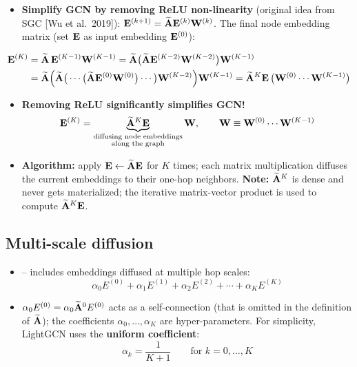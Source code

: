 \begin{itemize}
  \item \textbf{Simplify GCN by removing ReLU non-linearity} (original idea
    from SGC [Wu et al.\ 2019]): $\mathbf{E}^{(k+1)}=\widetilde{\mathbf{A}}\mathbf{E}^{(k)}\mathbf{W}^{(k)}$. The final
    node embedding matrix (set $\mathbf{E}$ as input embedding $\mathbf{E}^{(0)}$):
\end{itemize}
\begin{align}
  \mathbf{E}^{(K)} &= \widetilde{\mathbf{A}}\,\mathbf{E}^{(K-1)}\mathbf{W}^{(K-1)}
   = \widetilde{\mathbf{A}}\big(\widetilde{\mathbf{A}}\mathbf{E}^{(K-2)}\mathbf{W}^{(K-2)}\big)\mathbf{W}^{(K-1)}\notag\\
  &= \widetilde{\mathbf{A}}\Big(\widetilde{\mathbf{A}}\big(\cdots\big(\widetilde{\mathbf{A}}\mathbf{E}^{(0)}\mathbf{W}^{(0)}\big)\cdots\big)
     \mathbf{W}^{(K-2)}\Big)\mathbf{W}^{(K-1)}
   = \widetilde{\mathbf{A}}^K\mathbf{E}\,\big(\mathbf{W}^{(0)}\cdots\mathbf{W}^{(K-1)}\big)
  \label{eq:lec11-unroll}
\end{align}
\begin{itemize}
  \item \textbf{Removing ReLU significantly simplifies GCN!}
    \begin{equation}\label{eq:lec11-diffuse}
      \mathbf{E}^{(K)}=\underbrace{\widetilde{\mathbf{A}}^K\mathbf{E}}_{\substack{\text{diffusing node
      embeddings}\\\text{along the graph}}}\mathbf{W},\qquad
      \mathbf{W}\equiv\mathbf{W}^{(0)}\cdots\mathbf{W}^{(K-1)}
    \end{equation}
  \item \textbf{Algorithm:} apply $\mathbf{E}\leftarrow\widetilde{\mathbf{A}}\mathbf{E}$ for $K$ times; each
    matrix multiplication diffuses the current embeddings to their one-hop
    neighbors. \textbf{Note:} $\widetilde{\mathbf{A}}^K$ is dense and never gets materialized;
    the iterative matrix-vector product is used to compute $\widetilde{\mathbf{A}}^K\mathbf{E}$.
\end{itemize}

\subsection{Multi-scale diffusion}\label{sec:lec11-multiscale}

\begin{itemize}
  \item {} -- includes embeddings diffused at multiple
    hop scales:
    \begin{equation}\label{eq:lec11-multiscale}
      \alpha_0E^{(0)}+\alpha_1E^{(1)}+\alpha_2E^{(2)}+\cdots+\alpha_KE^{(K)}
    \end{equation}
  \item $\alpha_0E^{(0)}=\alpha_0\widetilde{\mathbf{A}}^0E^{(0)}$ acts as a self-connection (that
    is omitted in the definition of $\widetilde{\mathbf{A}}$); the coefficients
    $\alpha_0,\dots,\alpha_K$ are hyper-parameters. For simplicity, LightGCN
    uses the \textbf{uniform coefficient}:
    \begin{equation}\label{eq:lec11-alpha}
      \alpha_k=\frac{1}{K+1}\qquad\text{for }k=0,\dots,K
    \end{equation}
\end{itemize}

